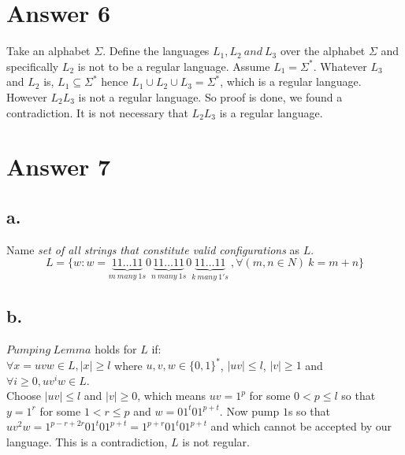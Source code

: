\documentclass[12pt]{article}
\begin{document}

\section*{Answer 6}

Take an alphabet $\Sigma$. Define the languages $L_1,L_2\ and\ L_3$ over the alphabet $\Sigma$ and specifically $L_2$ is not to be a regular language. Assume $L_1=\Sigma^*$. Whatever $L_3$ and $L_2$ is, $L_1\subseteq \Sigma^*$ hence $L_1\cup L_2 \cup L_3 = \Sigma^*$, which is a regular language. However $L_2L_3$ is not a regular language. So proof is done, we found a contradiction. It is not necessary that $L_2L_3$ is a regular language. 

\section*{Answer 7}

\subsection*{a.}

Name \textit{set of all strings that constitute valid configurations} as $L$.$$L=\{w : w=\underbrace{11\dots11}_{m\ many\ 1s}0\underbrace{11\dots11}_{n\ many\ 1s}0\underbrace{11\dots11}_{k\ many\ 1's}\ ,\forall(m,n \in N)\ k=m+n\}$$

\subsection*{b.}

$Pumping\ Lemma$ holds for $L$ if:\\

$\forall x=uvw\in L, |x|\geq l$ where $u,v,w\in \{0,1\}^*$, $|uv|\leq l$, $|v|\geq 1$ and $\forall i\geq 0, uv^iw\in L$.\\

Choose $|uv|\leq l$ and $|v|\geq 0$, which means $uv=1^p$ for some $0<p\leq l$ so that $y=1^r$ for some $1<r\leq p$ and $w=01^t01^{p+t}$. Now pump $1$s so that $uv^2w=1^{p-r+2r}01^t01^{p+t}=1^{p+r}01^t01^{p+t}$ and which cannot be accepted by our language. This is a contradiction, $L$ is not regular.
\end{document}

